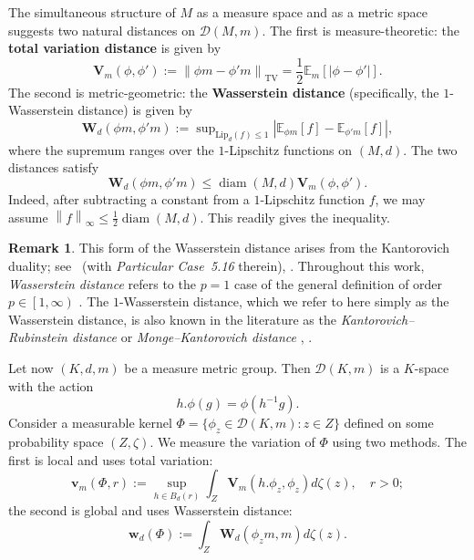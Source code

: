 \documentclass{amsart}
\numberwithin{equation}{subsection}
\theoremstyle{plain}
\theoremstyle{definition}
\newtheorem{rem}[rem]{Remark}
\theoremstyle{plain}
\begin{document}
\smallskip

The simultaneous structure of \(M\) as a measure space and as a metric space suggests two natural distances on \(\mathcal{D}\left(M,m\right)\). The first is measure-theoretic: the {\bf total variation distance} is given by
\[\mathbf{V}_{m}\left(\phi,\phi'\right):=\left\|\phi m-\phi' m\right\|_{\operatorname{TV}}=\frac{1}{2}\mathbb{E}_{m}\left[\left|\phi-\phi'\right|\right].\]
The second is metric-geometric: the {\bf Wasserstein distance} (specifically, the \(1\)-Wasserstein distance) is given by
\[\mathbf{W}_{d}\left(\phi m,\phi' m\right):=\sup\nolimits_{\mathrm{Lip}_{d}\left(f\right)\leq1}\left|\mathbb{E}_{\phi m}\left[f\right]-\mathbb{E}_{\phi' m}\left[f\right]\right|,\]
where the supremum ranges over the \(1\)-Lipschitz functions on \(\left(M,d\right)\). The two distances satisfy
\[\mathbf{W}_{d}\left(\phi m,\phi' m\right)\leq\operatorname{diam}\left(M,d\right)\mathbf{V}_{m}\left(\phi,\phi'\right).\]
Indeed, after subtracting a constant from a \(1\)-Lipschitz function \(f\), we may assume \(\left\|f\right\|_{\infty}\leq\frac{1}{2}\operatorname{diam}\left(M,d\right)\). This readily gives the inequality.

\begin{rem}
This form of the Wasserstein distance arises from the Kantorovich duality; see~\cite[Thm.~5.10, Rem.~6.5]{villani2009optimal} (with \emph{Particular Case~5.16} therein), \cite[Thm.~4.13]{vanHandel2016}. Throughout this work, \emph{Wasserstein distance} refers to the \(p=1\) case of the general definition of order \(p\in\left[1,\infty\right)\) \cite[Def.~6.4]{villani2009optimal}. The \(1\)-Wasserstein distance, which we refer to here simply as the Wasserstein distance, is also known in the literature as the \emph{Kantorovich--Rubinstein distance} or \emph{Monge--Kantorovich distance} \cite[Rem.~6.5]{villani2009optimal}, \cite[\S5]{Pestov2010}.
\end{rem}

Let now \(\left(K,d,m\right)\) be a measure metric group. Then \(\mathcal{D}\left(K,m\right)\) is a \(K\)-space with the action
\[h.\phi\left(g\right)=\phi\left(h^{-1}g\right).\]
Consider a measurable kernel \(\Phi=\{\phi_{z}\in\mathcal{D}\left(K,m\right):z\in Z\}\) defined on some probability space \(\left(Z,\zeta\right)\). We measure the variation of \(\Phi\) using two methods. The first is local and uses total variation:
\[\mathbf{v}_{m}\left(\Phi,r\right):=\sup_{h\in B_{d}\left(r\right)}\int_{Z}\mathbf{V}_{m}\left(h.\phi_{z},\phi_{z}\right)d\zeta\left(z\right),\quad r>0;\]
the second is global and uses Wasserstein distance:
\[\mathbf{w}_{d}\left(\Phi\right):=\int_{Z}\mathbf{W}_{d}\left(\phi_{z}m,m\right)d\zeta\left(z\right).\]
\end{document}
